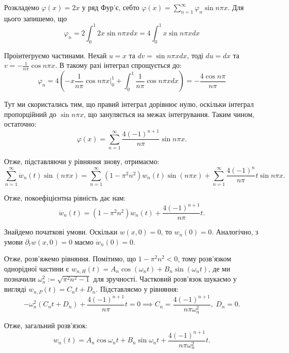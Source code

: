 \documentclass{hw_template}
\begin{document}
Розкладемо $\varphi(x)=2x$ у ряд Фур'є, себто $\varphi(x) = \sum_{n=1}^{\infty}\varphi_n\sin n\pi x$. Для цього запишемо, що
\begin{equation*}
    \varphi_n = 2\int_0^1 2x \sin n\pi x dx = 4\int_0^1 x \sin n\pi xdx
\end{equation*}

Проінтегруємо частинами. Нехай $u=x$ та $dv=\sin n\pi xdx$, тоді $du=dx$ та
$v=-\frac{1}{n\pi}\cos n\pi x$. В такому разі інтеграл спрощується до:
\begin{equation*}
    \varphi_n = 4\left(-x\frac{1}{n\pi}\cos n\pi x\Big|_{0}^{1} + \int_0^1 \frac{1}{n\pi}\cos n\pi xdx\right) = -\frac{4\cos n\pi}{n\pi}
\end{equation*}

Тут ми скористались тим, що правий інтеграл дорівнює нулю, оскільки інтеграл 
пропорційний до $\sin n\pi x$, що зануляється на межах інтегрування. Таким чином, 
остаточно:
\begin{equation*}
    \varphi(x) = \sum_{n=1}^{\infty} \frac{4(-1)^{n+1}}{n\pi}\sin n\pi x.
\end{equation*}

Отже, підставляючи у рівняння знову, отримаємо:
\begin{equation*}
    \sum_{n=1}^{\infty} \ddot{w}_n(t) \sin(n\pi x) = \sum_{n=1}^{\infty} (1-\pi^2n^2)w_n(t) \sin(n\pi x) + \sum_{n=1}^{\infty} \frac{4(-1)^n}{n\pi}t\sin n\pi x.
\end{equation*}

Отже, покоефіцієнтна рівність дає нам:
\begin{equation*}
    \ddot{w}_n(t) = (1-\pi^2n^2)w_n(t) + \frac{4(-1)^{n+1}}{n\pi}t.
\end{equation*}

Знайдемо початкові умови. Оскільки $w(x,0)=0$, то $w_n(0)=0$. Аналогічно,
з умови $\partial_t w(x,0)=0$ маємо $\dot{w}_n(0)=0$.

Отже, розв'яжемо рівняння. Помітимо, що $1-\pi^2n^2<0$, тому розв'язком
однорідної частини є $w_{n,H}(t) = A_n\cos(\omega_n t) + B_n\sin(\omega_n t)$,
де ми позначили $\omega_n^2 := \sqrt{\pi^2n^2-1}$ для зручності. Частковий
розв'язок шукаємо у вигляді $w_{n,P}(t) = C_nt + D_n$. Підставляємо у рівняння:
\begin{equation*}
    -\omega_n^2(C_nt+D_n) + \frac{4(-1)^{n+1}}{n\pi}t = 0 \implies C_n = \frac{4(-1)^{n+1}}{n\pi\omega_n^2}, \; D_n = 0.
\end{equation*}

Отже, загальний розв'язок:
\begin{equation*}
    w_n(t) = A_n\cos \omega_n t + B_n\sin \omega_n t + \frac{4(-1)^{n+1}}{n\pi\omega_n^2}t.
\end{equation*}
\end{document}
